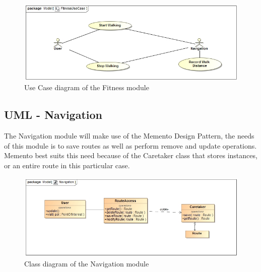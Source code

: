 \documentclass[12pt,a4paper]{article}
\begin{document}
	\begin{figure}
		\includegraphics[width=\linewidth]{Images/FitnessUseCase.jpg}
		\caption{Use Case diagram of the Fitness module}
	\end{figure}
	
	\subsection{UML - Navigation}
	The Navigation module will make use of the Memento Design Pattern, the needs of this module is to save routes as well as perform remove and update operations. Memento best suits this need because of the Caretaker class that stores instances, or an entire route in this particular case.
	\begin{figure}
		\includegraphics[width=\linewidth]{Images/Navigation.jpg}
		\caption{Class diagram of the Navigation module}
	\end{figure}
	
\end{document}
